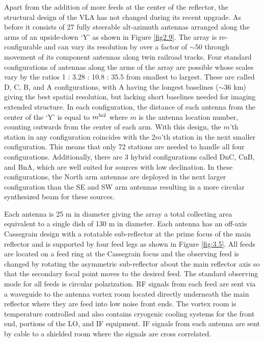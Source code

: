 Apart from the addition of more feeds at the center of the reflector, the structural design of the VLA has not changed during its recent upgrade. As before it consists of 27 fully steerable alt-azimuth antennas arranged along the arms of an upside-down `Y' as shown in Figure \ref{fig2.9}.  The array is re-configurable and can vary its resolution by over a factor of $\sim 50$ through movement of its component antennas along twin railroad tracks. Four standard configurations of antennas along the arms of the array are possible whose scales vary by the ratios 1 : 3.28 : 10.8 : 35.5 from smallest to largest. These are called D, C, B, and A configurations, with A having the longest baselines ($\sim 36$ km) giving the best spatial resolution, but lacking short baselines needed for imaging extended structure. In each configuration, the distance of each antenna from the center of the `Y' is equal to $m^{\rm{ln}2}$ where $m$ is the antenna location number, counting outwards from the center of each arm. With this design, the $m$'th station in any configuration coincides with the 2$m$'th station in the next smaller configuration. This means that only 72 stations are needed to handle all four configurations. Additionally, there are 3 hybrid configurations called DnC, CnB, and BnA, which are well suited for sources with low declination. In these configurations, the North arm antennas are deployed in the next larger configuration than the SE and SW arm antennas resulting in a more circular synthesized beam for these sources.

Each antenna is 25 m in diameter giving the array a total collecting area equivalent to a single dish of 130 m in diameter. Each antenna has an off-axis Cassegrain design with a rotatable sub-reflector at the prime focus of the main reflector and is supported by four feed legs as shown in Figure \ref{fig:3.5}. All feeds are located on a feed ring at the Cassegrain focus and the observing feed is changed by rotating the asymmetric sub-reflector about the main reflector axis so that the secondary focal point moves to the desired feed. The standard observing mode for all feeds is circular polarization. RF signals from each feed  are sent via a waveguide to the antenna vortex room located directly underneath the main reflector where they are feed into low noise front ends. The vortex room is temperature controlled and also contains cryogenic cooling systems for the front end, portions of the LO, and IF equipment. IF signals from each antenna are sent by cable to a shielded room where the signals are cross correlated.

